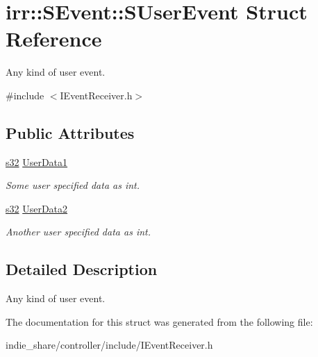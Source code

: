 \hypertarget{structirr_1_1SEvent_1_1SUserEvent}{}\section{irr\+:\+:S\+Event\+:\+:S\+User\+Event Struct Reference}
\label{structirr_1_1SEvent_1_1SUserEvent}


Any kind of user event.  




{\ttfamily \#include $<$I\+Event\+Receiver.\+h$>$}

\subsection*{Public Attributes}
\begin{DoxyCompactItemize}
\item 
\mbox{\label{structirr_1_1SEvent_1_1SUserEvent_adb57182c0dce9791b1ac67baea96d5b8}} 
\hyperlink{namespaceirr_ac66849b7a6ed16e30ebede579f9b47c6}{s32} \hyperlink{structirr_1_1SEvent_1_1SUserEvent_adb57182c0dce9791b1ac67baea96d5b8}{User\+Data1}
\begin{DoxyCompactList}\small\item\em Some user specified data as int. \end{DoxyCompactList}\item 
\mbox{\label{structirr_1_1SEvent_1_1SUserEvent_a13214839a30e63bcee17f94f0df395d8}} 
\hyperlink{namespaceirr_ac66849b7a6ed16e30ebede579f9b47c6}{s32} \hyperlink{structirr_1_1SEvent_1_1SUserEvent_a13214839a30e63bcee17f94f0df395d8}{User\+Data2}
\begin{DoxyCompactList}\small\item\em Another user specified data as int. \end{DoxyCompactList}\end{DoxyCompactItemize}


\subsection{Detailed Description}
Any kind of user event. 

The documentation for this struct was generated from the following file\+:\begin{DoxyCompactItemize}
\item 
indie\+\_\+share/controller/include/I\+Event\+Receiver.\+h\end{DoxyCompactItemize}
